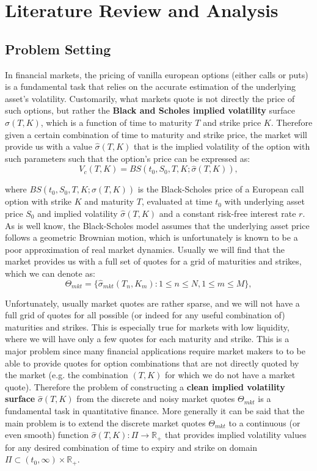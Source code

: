 \section{Literature Review and Analysis}

\subsection{Problem Setting}
In financial markets, the pricing of vanilla european options (either calls or puts) is a fundamental task that relies on the accurate estimation of the underlying asset's volatility.
Customarily, what markets quote is not directly the price of such options, but rather the \textbf{Black and Scholes implied volatility} surface $\hat{\sigma}(T,K)$, which is a function of time to maturity $T$ and strike price $K$.
Therefore given a certain combination of time to maturity and strike price, the market will provide us with a value $\hat{\sigma}(T,K)$ that is the implied volatility of the option with such parameters such that the option's price can be expressed as:
\begin{equation}
    V_c(T,K) = BS(t_0, S_0, T, K; \hat{\sigma}(T,K)),
\end{equation}

where $BS(t_0, S_0, T, K; \hat{\sigma}(T,K))$ is the Black-Scholes price of a European call option with strike $K$ and maturity $T$, evaluated at time $t_0$ with underlying asset price $S_0$ and implied volatility $\hat{\sigma}(T,K)$ and a constant risk-free interest rate $r$.
As is well know, the Black-Scholes model assumes that the underlying asset price follows a geometric Brownian motion, which is unfortunately is known to be a poor approximation of real market dynamics.
Usually we will find that the market provides us with a full set of quotes for a grid of maturities and strikes, which we can denote as:
\begin{equation}
    \Theta_{mkt} = \{\hat{\sigma}_{mkt}(T_n, K_m) : 1 \leq n \leq N, 1 \leq m \leq M\},
\end{equation}

Unfortunately, usually market quotes are rather sparse, and we will not have a full grid of quotes for all possible (or indeed for any useful combination of) maturities and strikes.
This is especially true for markets with low liquidity, where we will have only a few quotes for each maturity and strike.
This is a major problem since many financial applications require market makers to to be able to provide quotes for option combinations that are not directly quoted by the market (e.g. the combination $(T,K)$ for which we do not have a market quote).
Therefore the problem of constructing a \textbf{clean implied volatility surface} $\hat{\sigma}(T,K)$ from the discrete and noisy market quotes $\Theta_{mkt}$ is a fundamental task in quantitative finance.
More generally it can be said that the main problem is to extend the discrete market quotes $\Theta_{mkt}$ to a continuous (or even smooth) function $\hat{\sigma}(T,K): \Pi \rightarrow \mathbb{R}_+$ that provides implied volatility values for any desired combination of time to expiry and strike on domain $\Pi \subset (t_0, \infty) \times \mathbb{R}_+$.

